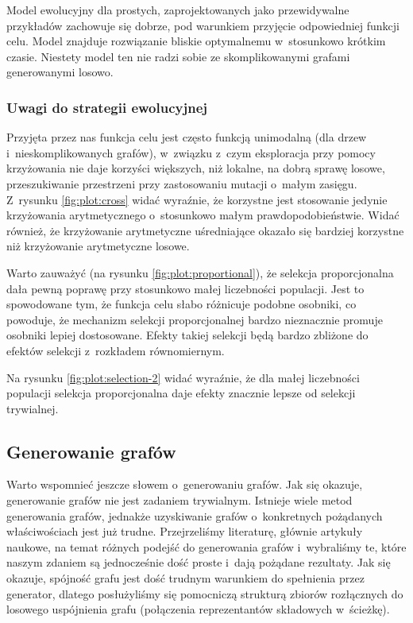 \documentclass[a4paper,onecolumn,oneside,12pt]{mwart}
\begin{document}
Model ewolucyjny dla prostych, zaprojektowanych jako przewidywalne
przykładów zachowuje się dobrze, pod warunkiem przyjęcie odpowiedniej
funkcji celu. Model znajduje rozwiązanie bliskie optymalnemu w~stosunkowo
krótkim czasie. Niestety model ten nie radzi sobie ze skomplikowanymi
grafami generowanymi losowo.

\subsubsection{Uwagi do strategii ewolucyjnej}

Przyjęta przez nas funkcja celu jest często funkcją unimodalną (dla drzew
i~nieskomplikowanych grafów), w~związku z~czym eksploracja przy pomocy
krzyżowania nie daje korzyści większych, niż lokalne, na dobrą sprawę
losowe, przeszukiwanie przestrzeni przy zastosowaniu mutacji o~małym
zasięgu. Z~rysunku \ref{fig:plot:cross} widać wyraźnie, że korzystne jest
stosowanie jedynie krzyżowania arytmetycznego o~stosunkowo małym
prawdopodobieństwie. Widać również, że krzyżowanie arytmetyczne
uśredniające okazało się bardziej korzystne niż krzyżowanie arytmetyczne
losowe.

Warto zauważyć (na rysunku \ref{fig:plot:proportional}), że selekcja
proporcjonalna dała pewną poprawę przy stosunkowo małej liczebności
populacji. Jest to spowodowane tym, że funkcja celu słabo różnicuje podobne
osobniki, co powoduje, że mechanizm selekcji proporcjonalnej bardzo
nieznacznie promuje osobniki lepiej dostosowane. Efekty takiej selekcji
będą bardzo zbliżone do efektów selekcji z~rozkładem równomiernym.

Na rysunku \ref{fig:plot:selection-2} widać wyraźnie, że dla małej
liczebności populacji selekcja proporcjonalna daje efekty znacznie lepsze
od selekcji trywialnej.

\subsection{Generowanie grafów}

Warto wspomnieć jeszcze słowem o~generowaniu grafów. Jak się okazuje,
generowanie grafów nie jest zadaniem trywialnym. Istnieje wiele metod
generowania grafów, jednakże uzyskiwanie grafów o~konkretnych pożądanych
właściwościach jest już trudne. Przejrzeliśmy literaturę, głównie artykuły
naukowe, na temat różnych podejść do generowania grafów i~wybraliśmy te,
które naszym zdaniem są jednocześnie dość proste i~dają pożądane rezultaty.
Jak się okazuje, spójność grafu jest dość trudnym warunkiem do spełnienia
przez generator, dlatego posłużyliśmy się pomocniczą strukturą zbiorów
rozłącznych do losowego uspójnienia grafu (połączenia reprezentantów
składowych w~ścieżkę).
\end{document}
